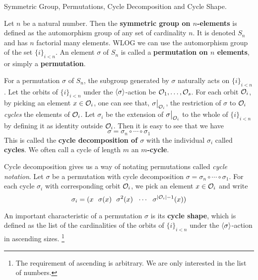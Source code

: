 \documentclass[../../book.tex]{subfiles}
\begin{document}
\begin{dfn} Symmetric Group, Permutations, Cycle Decomposition and Cycle Shape.
    
    Let $n$ be a natural number. 
    Then the \textbf{symmetric group on $n$-elements} is defined as
    the automorphism group of any set of cardinality $n$. 
    It is denoted $S_n$ and has $n$ factorial many elements. 
    WLOG we can use the automorphism group of the set $\{i\}_{i<n}$.
    An element $\sigma$ of $S_n$ is called a \textbf{permutation on $n$ elements},
    or simply a \textbf{permutation}. 
    
    For a permutation $\sigma$ of $S_n$, 
    the subgroup generated by $\sigma$ naturally acts on $\{i\}_{i<n}$. 
    Let the orbits of $\{i\}_{i<n}$ under the $\langle\sigma\rangle$-action 
    be $\mathcal{O}_1,\dots,\mathcal{O}_s$. 
    For each orbit $\mathcal{O}_i$, by picking an element $x \in \mathcal{O}_i$, 
    one can see that, $\res{\sigma}{\O_i}$, 
    the restriction of $\sigma$ to $\mathcal{O}_i$ \emph{cycles} the elements of $\mathcal{O}_i$. 
    Let $\sigma_i$ be the extension
    of $\res{\sigma}{\O_i}$ to the whole of $\{i\}_{i<n}$
    by defining it as identity outside $\mathcal{O}_i$. 
    Then it is easy to see that we have \[
        \sigma = \sigma_n \circ \cdots \circ \sigma_1
    \]
    This is called the \textbf{cycle decomposition of $\sigma$}
    with the individual $\sigma_i$ called \textbf{cycles}.
    We often call a cycle of length $m$ an \textbf{$m$-cycle}. 
    
    Cycle decomposition gives us a way of notating permutations 
    called \emph{cycle notation}.
    Let $\sigma$ be a permutation with cycle decomposition 
    $\sigma = \sigma_n \circ \cdots \circ \sigma_1$. 
    For each cycle $\sigma_i$ with corresponding orbit $\mathcal{O}_i$, 
    we pick an element $x \in \mathcal{O}_i$ and write \[
        \sigma_i = 
        ( x \mspace{12mu} \sigma(x) \mspace{12mu} \sigma^2(x) 
        \mspace{12mu} \cdots \mspace{12mu} \sigma^{|\mathcal{O}_i| - 1}(x))
    \]
     
    
    An important characteristic of a permutation $\sigma$ is 
    its \textbf{cycle shape}, which is defined as 
    the list of the cardinalities of the orbits of $\{i\}_{i<n}$ 
    under the $\langle\sigma\rangle$-action in ascending sizes. 
    \footnote{
        The requirement of ascending is arbitrary. 
        We are only interested in the list of numbers. 
    }
    
\end{dfn}
\end{document}
